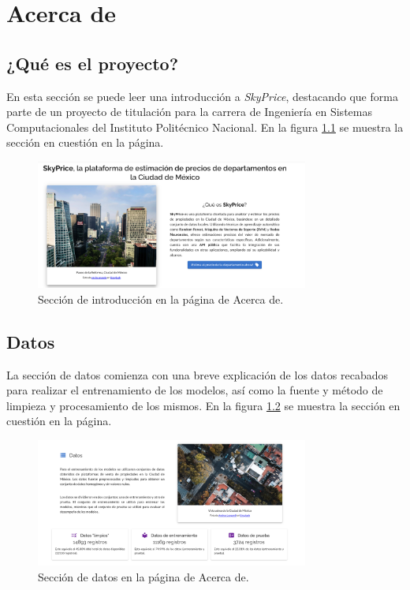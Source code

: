 \chapter{\textcolor{azulescom}{Acerca de}}

\section{¿Qué es el proyecto?}
En esta sección se puede leer una introducción a \textit{SkyPrice}, destacando
que forma parte de un proyecto de titulación para la carrera de Ingeniería en
Sistemas Computacionales del Instituto Politécnico Nacional. En la figura
\ref{fig:intro} se muestra la sección en cuestión en la página.

\begin{figure}[H]
  \centering
  \includegraphics[width=0.8\textwidth]{imagenes/04-acerca-de/intro.png}
  \caption{Sección de introducción en la página de Acerca de.}
  \label{fig:intro}
\end{figure}

\section{Datos}
La sección de datos comienza con una breve explicación de los datos recabados
para realizar el entrenamiento de los modelos, así como la fuente y método de
limpieza y procesamiento de los mismos. En la figura \ref{fig:datos} se muestra
la sección en cuestión en la página.

\begin{figure}[H]
  \centering
  \includegraphics[width=0.8\textwidth]{imagenes/04-acerca-de/datos.png}
  \caption{Sección de datos en la página de Acerca de.}
  \label{fig:datos}
\end{figure}

